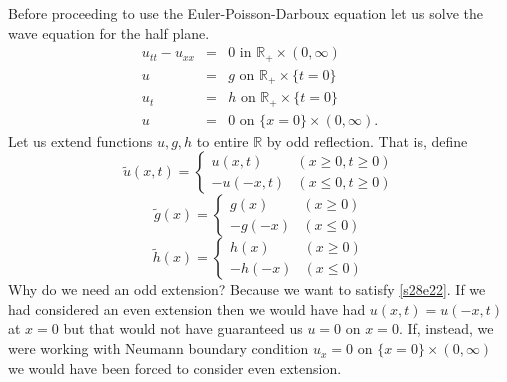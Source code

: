 \documentclass{article}
\theoremstyle{plain}
\numberwithin{thm}{section}
\theoremstyle{plain}
\numberwithin{prop}{section}
\theoremstyle{definition}
\numberwithin{defn}{section}
\theoremstyle{remark}
\numberwithin{equation}{section}
\begin{document}
Before proceeding to use the Euler-Poisson-Darboux equation let us solve the wave equation for the half plane.
\begin{eqnarray}
u_{tt} - u_{xx} &=& 0  \text{ in } \mathbb{R}_+ \times (0, \infty) \label{s28e19} \\
u &=& g  \text{ on } \mathbb{R}_+ \times \{t = 0\} \label{s28e20} \\
u_t &=& h \text{ on } \mathbb{R}_+ \times \{t = 0\} \label{s28e21} \\
u &=& 0 \text{ on } \{x = 0\} \times (0, \infty) \label{s28e22}.
\end{eqnarray}
Let us extend functions $u, g, h$ to entire $\mathbb{R}$ by odd reflection. That is, define
\begin{equation}\label{s28e23}
\tilde{u}(x, t) = \begin{cases}
u(x, t) & (x \ge 0, t \ge 0) \\
-u(-x, t) & (x \le 0, t \ge 0)
\end{cases}
\end{equation}
\begin{equation}\label{s28e24}
\tilde{g}(x) = \begin{cases}
g(x) & (x \ge 0) \\
-g(-x) & (x \le 0)
\end{cases}
\end{equation}
\begin{equation}\label{s28e25}
\tilde{h}(x) = \begin{cases}
h(x) & (x \ge 0) \\
-h(-x) & (x \le 0)
\end{cases}
\end{equation}
Why do we need an odd extension? Because we want to satisfy \eqref{s28e22}. If we had considered an even extension 
then we would have had $u(x, t) = u(-x, t)$ at $x = 0$ but that would not have guaranteed us $u = 0$ on $x = 0$. 
If, instead, we were working with Neumann boundary condition $u_x = 0$ on $\{x = 0\} \times (0, \infty)$ we would 
have been forced to consider even extension.
\end{document}
